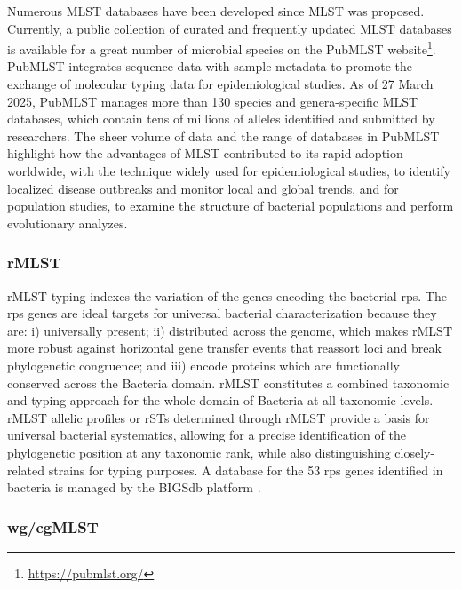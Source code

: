 Numerous \ac{MLST} databases have been developed since \ac{MLST} was proposed. Currently, a public collection of curated and frequently updated \ac{MLST} databases is available for a great number of microbial species on the PubMLST website\footnote{\url{https://pubmlst.org/}}. PubMLST integrates sequence data with sample metadata to promote the exchange of molecular typing data for epidemiological studies. As of 27 March 2025, PubMLST manages more than 130 species and genera-specific \ac{MLST} databases, which contain tens of millions of alleles identified and submitted by researchers. The sheer volume of data and the range of databases in PubMLST highlight how the advantages of \ac{MLST} contributed to its rapid adoption worldwide, with the technique widely used for epidemiological studies, to identify localized disease outbreaks and monitor local and global trends, and for population studies, to examine the structure of bacterial populations and perform evolutionary analyzes.

\subsubsection{rMLST}

\ac{rMLST} typing indexes the variation of the genes encoding the bacterial \ac{rps}. The \ac{rps} genes are ideal targets for universal bacterial characterization because they are: i) universally present; ii) distributed across the genome, which makes \ac{rMLST} more robust against horizontal gene transfer events that reassort loci and break phylogenetic congruence; and iii) encode proteins which are functionally conserved across the Bacteria domain. \ac{rMLST} constitutes a combined taxonomic and typing approach for the whole domain of Bacteria at all taxonomic levels. \ac{rMLST} allelic profiles or \ac{rSTs} determined through \ac{rMLST} provide a basis for universal bacterial systematics, allowing for a precise identification of the phylogenetic position at any taxonomic rank, while also distinguishing closely-related strains for typing purposes. A database for the 53 \ac{rps} genes identified in bacteria is managed by the \ac{BIGSdb} platform \cite{maiden_mlst_2013}.

\subsubsection{wg/cgMLST}


